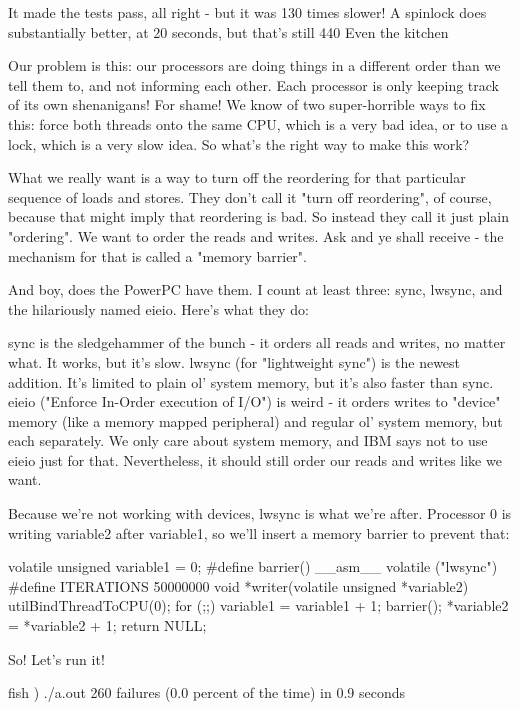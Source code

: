 {{{{It made the tests pass, all right - but it was 130 times slower! A spinlock does substantially better, at 20 seconds, but that's still 440%
Even the kitchen

Our problem is this: our processors are doing things in a different order than we tell them to, and not informing each other. Each processor is only keeping track of its own shenanigans! For shame! We know of two super-horrible ways to fix this: force both threads onto the same CPU, which is a very bad idea, or to use a lock, which is a very slow idea. So what's the right way to make this work?

What we really want is a way to turn off the reordering for that particular sequence of loads and stores. They don't call it "turn off reordering", of course, because that might imply that reordering is bad. So instead they call it just plain "ordering". We want to order the reads and writes. Ask and ye shall receive - the mechanism for that is called a "memory barrier".

And boy, does the PowerPC have them. I count at least three: sync, lwsync, and the hilariously named eieio. Here's what they do:

    sync is the sledgehammer of the bunch - it orders all reads and writes, no matter what. It works, but it's slow.
    lwsync (for "lightweight sync") is the newest addition. It's limited to plain ol' system memory, but it's also faster than sync.
    eieio ("Enforce In-Order execution of I/O") is weird - it orders writes to "device" memory (like a memory mapped peripheral) and regular ol' system memory, but each separately. We only care about system memory, and IBM says not to use eieio just for that. Nevertheless, it should still order our reads and writes like we want.

Because we're not working with devices, lwsync is what we're after. Processor 0 is writing variable2 after variable1, so we'll insert a memory barrier to prevent that: 

volatile unsigned variable1 = 0;
#define barrier() __asm__ volatile ("lwsync")
#define ITERATIONS 50000000
void *writer(volatile unsigned *variable2) {
        utilBindThreadToCPU(0);
        for (;;) {
                variable1 = variable1 + 1;
                barrier();
                *variable2 = *variable2 + 1;
        }
        return NULL;
}

So! Let's run it!

fish ) ./a.out
260 failures (0.0 percent of the time) in 0.9 seconds




}}}}
